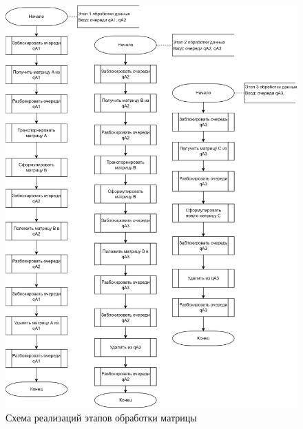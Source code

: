 \begin{figure}[h]
	\centering
	\includegraphics[scale=0.18]{img/stages.png}
	\caption{Схема реализаций этапов обработки матрицы}
	\label{fig:stages}
\end{figure} 

\clearpage